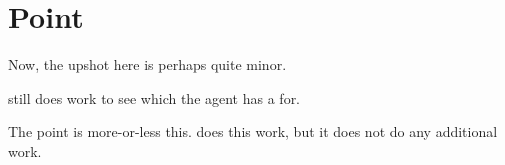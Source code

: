 \section{Point}
\label{sec:point}

\begin{note}
  Now, the upshot here is perhaps quite minor.

  \issueInclusion{} still does work to see which \ros{} the agent has a \wit{} for.

  The point is more-or-less this.
  \issueInclusion{} does this work, but it does not do any additional work.
\end{note}



